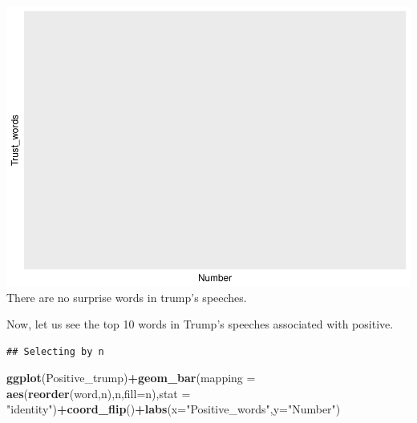 \documentclass[]{article}
\newenvironment{Shaded}{\begin{snugshade}}{\end{snugshade}}
\newcommand{\KeywordTok}[1]{\textcolor[rgb]{0.13,0.29,0.53}{\textbf{#1}}}
\newcommand{\DataTypeTok}[1]{\textcolor[rgb]{0.13,0.29,0.53}{#1}}
\newcommand{\DecValTok}[1]{\textcolor[rgb]{0.00,0.00,0.81}{#1}}
\newcommand{\StringTok}[1]{\textcolor[rgb]{0.31,0.60,0.02}{#1}}
\newcommand{\OperatorTok}[1]{\textcolor[rgb]{0.81,0.36,0.00}{\textbf{#1}}}
\newcommand{\NormalTok}[1]{#1}
\begin{document}
\includegraphics{Donald_Trump_Speech_sentiment_analysis_files/figure-latex/unnamed-chunk-35-1.pdf}
There are no surprise words in trump's speeches.

Now, let us see the top 10 words in Trump's speeches associated with
positive.

\begin{Shaded}
\end{Shaded}

\begin{verbatim}
## Selecting by n
\end{verbatim}

\begin{Shaded}
\begin{Highlighting}[]
\KeywordTok{ggplot}\NormalTok{(Positive_trump)}\OperatorTok{+}\KeywordTok{geom_bar}\NormalTok{(}\DataTypeTok{mapping =} \KeywordTok{aes}\NormalTok{(}\KeywordTok{reorder}\NormalTok{(word,n),n,}\DataTypeTok{fill=}\NormalTok{n),}\DataTypeTok{stat =} \StringTok{"identity"}\NormalTok{)}\OperatorTok{+}\KeywordTok{coord_flip}\NormalTok{()}\OperatorTok{+}\KeywordTok{labs}\NormalTok{(}\DataTypeTok{x=}\StringTok{"Positive_words"}\NormalTok{,}\DataTypeTok{y=}\StringTok{"Number"}\NormalTok{)}
\end{Highlighting}
\end{Shaded}
\end{document}
